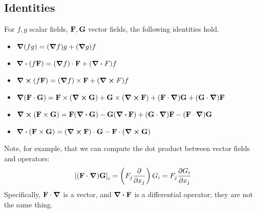 \documentclass{article}
\begin{document}
\subsection{Identities}
\begin{proposition}
    For $f, g$ scalar fields, $\vb F, \vb G$ vector fields, the following identities hold.
    \begin{itemize}
        \item $\grad(fg) = (\grad f)g + (\grad g)f$
        \item $\div(f \vb F) = (\grad f)\cdot \vb F + (\div F)f$
        \item $\curl(f \vb F) = (\grad f)\times \vb F + (\curl F)f$
        \item $\grad(\vb F \cdot \vb G) = \vb F \times (\curl{\vb G}) + \vb G \times (\curl{\vb F}) + (\vb F \cdot \grad)\vb G + (\vb G \cdot \grad)\vb F$
        \item $\curl(\vb F \times \vb G) = \vb F(\div{\vb G}) - \vb G(\div{\vb F}) + (\vb G \cdot \grad)\vb F - (\vb F \cdot \grad)\vb G$
        \item $\div(\vb F \times \vb G) = (\curl{\vb F}) \cdot \vb G - \vb F \cdot (\curl{\vb G})$
    \end{itemize}
\end{proposition}
\noindent Note, for example, that we can compute the dot product between vector fields and operators:
\[ \left[ (\vb F \cdot \grad) \vb G \right]_i = \left( F_j \pdv{x_j} \right) G_i = F_j \pdv{G_i}{x_j} \]
Specifically, $\vb F \cdot \grad$ is a vector, and $\div{\vb F}$ is a differential operator; they are not the same thing.
\end{document}
